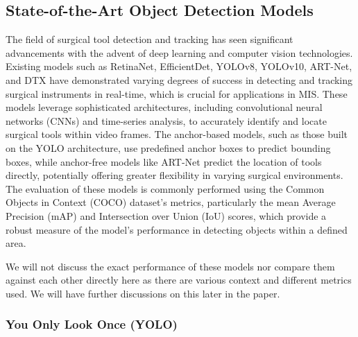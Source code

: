 \subsection{State-of-the-Art Object Detection Models}

The field of surgical tool detection and tracking has seen significant advancements with the advent of deep learning and computer vision technologies. Existing models such as RetinaNet, EfficientDet, YOLOv8, YOLOv10, ART-Net, and DTX have demonstrated varying degrees of success in detecting and tracking surgical instruments in real-time, which is crucial for applications in MIS. These models leverage sophisticated architectures, including convolutional neural networks (CNNs) and time-series analysis, to accurately identify and locate surgical tools within video frames. The anchor-based models, such as those built on the YOLO architecture, use predefined anchor boxes to predict bounding boxes, while anchor-free models like ART-Net predict the location of tools directly, potentially offering greater flexibility in varying surgical environments. The evaluation of these models is commonly performed using the Common Objects in Context (COCO) dataset's metrics, particularly the mean Average Precision (mAP) and Intersection over Union (IoU) scores, which provide a robust measure of the model's performance in detecting objects within a defined area. 

We will not discuss the exact performance of these models nor compare them against each other directly here as there are various context and different metrics used. We will have further discussions on this later in the paper.

\subsubsection{You Only Look Once (YOLO)}

